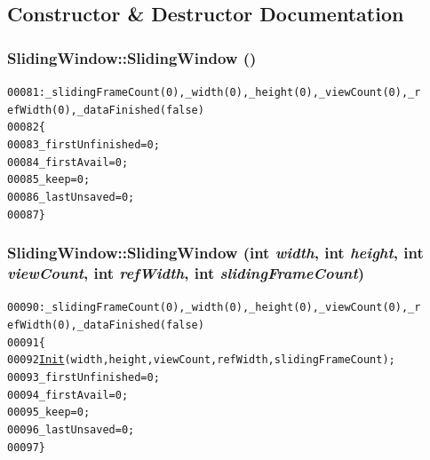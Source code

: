 \subsection{Constructor \& Destructor Documentation}
\hypertarget{class_sliding_window_a5fde76017cc202055cf3ae3011258106}{
\subsubsection[{SlidingWindow}]{\setlength{\rightskip}{0pt plus 5cm}SlidingWindow::SlidingWindow ()}}
\label{class_sliding_window_a5fde76017cc202055cf3ae3011258106}




\begin{footnotesize}\begin{alltt}
00081                 : \_slidingFrameCount(0), \_width(0), \_height(0), \_viewCount(0), \_r
      efWidth(0), \_dataFinished(\textcolor{keyword}{false})
00082         \{
00083                 \_firstUnfinished = 0;
00084                 \_firstAvail = 0;
00085                 \_keep = 0;
00086                 \_lastUnsaved = 0;
00087         \}
\end{alltt}\end{footnotesize}


\hypertarget{class_sliding_window_aa833d1b81d72234b0e37364295820e96}{
\subsubsection[{SlidingWindow}]{\setlength{\rightskip}{0pt plus 5cm}SlidingWindow::SlidingWindow (int {\em width}, \/  int {\em height}, \/  int {\em viewCount}, \/  int {\em refWidth}, \/  int {\em slidingFrameCount})}}
\label{class_sliding_window_aa833d1b81d72234b0e37364295820e96}




\begin{footnotesize}\begin{alltt}
00090                 : \_slidingFrameCount(0), \_width(0), \_height(0), \_viewCount(0), \_r
      efWidth(0), \_dataFinished(\textcolor{keyword}{false})
00091         \{
00092                 \hyperlink{class_sliding_window_ac71c1ed41e1b33a1ef3623c881e6d9d7}{Init}(width, height, viewCount, refWidth, slidingFrameCount);
00093                 \_firstUnfinished = 0;
00094                 \_firstAvail = 0;
00095                 \_keep = 0;
00096                 \_lastUnsaved = 0;
00097         \}
\end{alltt}\end{footnotesize}




